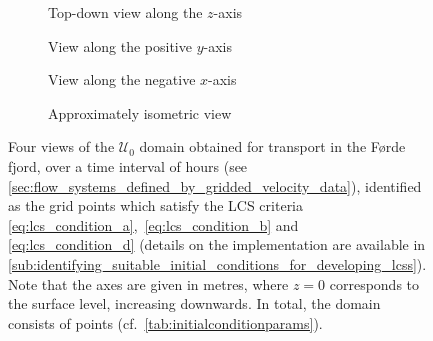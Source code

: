 \begin{figure}[htpb]
    \centering
    \hspace*{\fill}
    \begin{subfigure}[b]{0.43\textwidth}
        \centering
        \caption[]{{\small Top-down view along the $z$-axis}}
        \label{fig:fjord_abd_z}
    \end{subfigure}\hfill%
    \begin{subfigure}[b]{0.43\textwidth}
        \centering
        \caption[]{{\small View along the positive $y$-axis}}
        \label{fig:fjord_abd_y}
    \end{subfigure}
    \hspace*{\fill}

    \hspace*{\fill}
    \begin{subfigure}[b]{0.43\textwidth}
        \centering
        \caption[]{{\small View along the negative $x$-axis}}
        \label{fig:fjord_abd_x}
    \end{subfigure}\hfill%
    \begin{subfigure}[b]{0.43\textwidth}
        \centering
        \caption[]{{\small Approximately isometric view}}
        \label{fig:fjord_abd_isometric}
    \end{subfigure}%
    \hspace*{\fill}
    \caption[Four views of the $\mathcal{U}_{0}$ domain obtained for transport
    in the Førde fjord]
    {
        Four views of the $\mathcal{U}_{0}$ domain obtained for transport in
        the Førde fjord, over a time interval of  hours
        (see \cref{sec:flow_systems_defined_by_gridded_velocity_data}),
        identified as the grid points which satisfy the
        LCS criteria \eqref{eq:lcs_condition_a},~\eqref{eq:lcs_condition_b} and~
        \eqref{eq:lcs_condition_d} (details on the implementation are available
        in
        \cref{sub:identifying_suitable_initial_conditions_for_developing_lcss}).
        Note that the axes are given in metres, where $z=0$ corresponds to
        the surface level, increasing downwards. In total, the domain consists
        of  points (cf.\ \cref{tab:initialconditionparams}).
}
    \label{fig:fjord_abd}
\end{figure}

